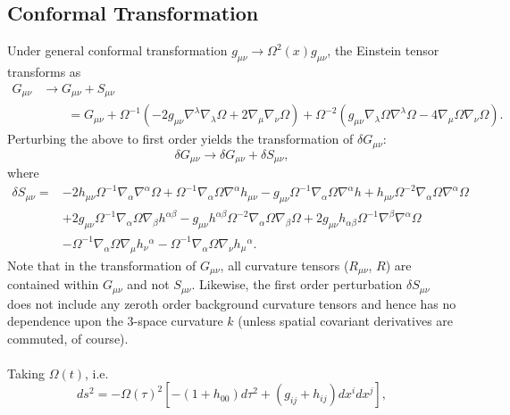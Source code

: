 \documentclass[10pt,letterpaper]{article}
\numberwithin{equation}{subsection}
\begin{document}
\subsection{Conformal Transformation}
Under general conformal transformation $g_{\mu\nu}\to \Omega^2(x)g_{\mu\nu}$, the  Einstein tensor transforms as
\begin{align}
G_{\mu\nu} &\to G_{\mu\nu} + S_{\mu\nu}
\nonumber\\
&\qquad= G_{\mu\nu} +
\Omega^{-1}\left( -2g_{\mu\nu}\nabla^\lambda \nabla_\lambda \Omega + 2\nabla_\mu \nabla_\nu \Omega\right) +
\Omega^{-2}\left( g_{\mu\nu} \nabla_\lambda \Omega \nabla^\lambda \Omega - 4 \nabla_\mu \Omega \nabla_\nu \Omega\right).
\end{align}
Perturbing the above to first order yields the transformation of $\delta G_{\mu\nu}$:
\begin{equation}
\delta G_{\mu\nu} \to \delta G_{\mu\nu} + \delta S_{\mu\nu},
\end{equation}
where
\begin{align}
\delta S_{\mu\nu}={}&-2 h_{\mu \nu} \Omega^{-1} \nabla_{\alpha}\nabla^{\alpha}\Omega
 + \Omega^{-1} \nabla_{\alpha}\Omega \nabla^{\alpha}h_{\mu \nu}
 -  g_{\mu \nu} \Omega^{-1} \nabla_{\alpha}\Omega \nabla^{\alpha}h
 + h_{\mu \nu} \Omega^{-2} \nabla_{\alpha}\Omega \nabla^{\alpha}\Omega\nonumber\\
& + 2 g_{\mu \nu} \Omega^{-1} \nabla_{\alpha}\Omega \nabla_{\beta}h^{\alpha \beta}
 -  g_{\mu \nu} h^{\alpha \beta} \Omega^{-2} \nabla_{\alpha}\Omega \nabla_{\beta}\Omega
 + 2 g_{\mu \nu} h_{\alpha \beta} \Omega^{-1} \nabla^{\beta}\nabla^{\alpha}\Omega\nonumber\\
& -  \Omega^{-1} \nabla_{\alpha}\Omega \nabla_{\mu}h_{\nu}{}^{\alpha}
 -  \Omega^{-1} \nabla_{\alpha}\Omega \nabla_{\nu}h_{\mu}{}^{\alpha}.
\end{align}
Note that in the transformation of $G_{\mu\nu}$, all curvature tensors ($R_{\mu\nu}$, $R$) are contained within $G_{\mu\nu}$ and not $S_{\mu\nu}$. Likewise, the first order perturbation $\delta S_{\mu\nu}$ does not include any zeroth order background curvature tensors and hence has no dependence upon the 3-space curvature $k$ (unless spatial covariant derivatives are commuted, of course). 
\\ \\
Taking $\Omega(t)$, i.e.
\begin{equation}
ds^2 = -\Omega(\tau)^2\left[ -(1+h_{00})d\tau^2 + (g_{ij}+h_{ij})dx^i dx^j\right],
\end{equation}
\end{document}
